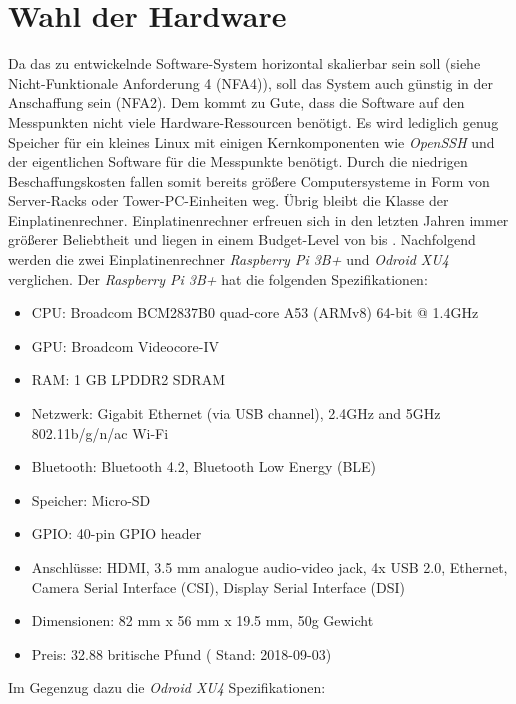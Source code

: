 \documentclass[titlepage]{report}
\begin{document}
\section{Wahl der Hardware}
Da das zu entwickelnde Software\hyp{}System horizontal skalierbar sein soll (siehe
Nicht-Funktionale Anforderung 4 (NFA4)), soll das System auch günstig in
der Anschaffung sein (NFA2). Dem kommt zu Gute, dass die Software auf den
Messpunkten nicht viele Hardware\hyp{}Ressourcen benötigt. Es wird
lediglich genug Speicher für ein kleines Linux mit einigen
Kernkomponenten wie \emph{OpenSSH} und der eigentlichen Software für die
Messpunkte benötigt. Durch die niedrigen Beschaffungskosten fallen somit
bereits größere Computersysteme in Form von Server\hyp{}Racks oder
Tower\hyp{}PC\hyp{}Einheiten weg. Übrig bleibt die Klasse der
Einplatinenrechner. Einplatinenrechner erfreuen sich in den letzten
Jahren immer größerer Beliebtheit und liegen in einem Budget\hyp{}Level
von  bis . Nachfolgend werden die zwei Einplatinenrechner
\emph{Raspberry Pi 3B+} und \emph{Odroid XU4} verglichen.
Der \emph{Raspberry Pi 3B+} hat die folgenden Spezifikationen\cite{RASPI}:
\begin{itemize}
    \item CPU: Broadcom BCM2837B0 quad-core A53 (ARMv8) 64-bit @ 1.4GHz
    \item GPU: Broadcom Videocore-IV
    \item RAM: 1 GB LPDDR2 SDRAM
    \item Netzwerk: Gigabit Ethernet (via USB channel), 2.4GHz and 5GHz 802.11b/g/n/ac Wi-Fi
    \item Bluetooth: Bluetooth 4.2, Bluetooth Low Energy (BLE)
    \item Speicher: Micro-SD
    \item GPIO: 40-pin GPIO header
    \item Anschlüsse: HDMI, 3.5 mm analogue audio-video jack, 4x USB 2.0, Ethernet, Camera Serial Interface
        (CSI), Display Serial Interface (DSI)
    \item Dimensionen: 82 mm x 56 mm x 19.5 mm, 50g Gewicht
    \item Preis: 32.88 britische Pfund\cite{RASPI_PRICE} ( Stand: 2018-09-03)
\end{itemize}
Im Gegenzug dazu die \emph{Odroid XU4} Spezifikationen\cite{ODROID}:
\end{document}
